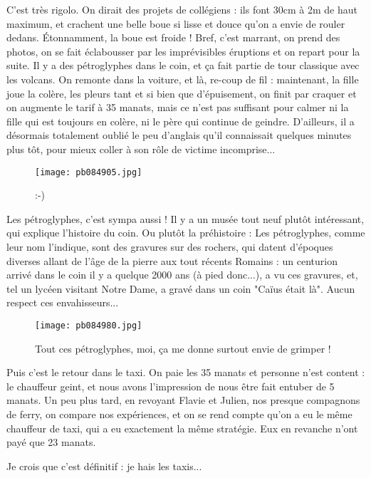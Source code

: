 \documentclass{book}
\begin{document}
C'est très rigolo. On dirait des projets de collégiens : ils font 30cm à 2m de haut maximum, et crachent une belle boue si lisse et douce qu'on a envie de rouler dedans. Étonnamment, la boue est froide ! Bref, c'est marrant, on prend des photos, on se fait éclabousser par les imprévisibles éruptions et on repart pour la suite. Il y a des pétroglyphes dans le coin, et ça fait partie de tour classique avec les volcans. On remonte dans la voiture, et là, re-coup de fil : maintenant, la fille joue la colère, les pleurs tant et si bien que d'épuisement, on finit par craquer et on augmente le tarif à 35 manats, mais ce n'est pas suffisant pour calmer ni la fille qui est toujours en colère, ni le père qui continue de geindre. D'ailleurs, il a désormais totalement oublié le peu d'anglais qu'il connaissait quelques minutes plus tôt, pour mieux coller à son rôle de victime incomprise...


\begin{figure}[h]
\centering
\texttt{[image: pb084905.jpg]}
\caption*{:-)}
\end{figure}

Les pétroglyphes, c'est sympa aussi ! Il y a un musée tout neuf plutôt intéressant, qui explique l'histoire du coin. Ou plutôt la préhistoire : Les pétroglyphes, comme leur nom l'indique, sont des gravures sur des rochers, qui datent d'époques diverses allant de l'âge de la pierre aux tout récents Romains : un centurion arrivé dans le coin il y a quelque 2000 ans (à pied donc...), a vu ces gravures, et, tel un lycéen visitant Notre Dame, a gravé dans un coin "Caïus était là". Aucun respect ces envahisseurs...


\begin{figure}[h]
\centering
\texttt{[image: pb084980.jpg]}
\caption*{Tout ces pétroglyphes, moi, ça me donne surtout envie de grimper !}
\end{figure}

Puis c'est le retour dans le taxi. On paie les 35 manats et personne n'est content : le chauffeur geint, et nous avons l'impression de nous être fait entuber de 5 manats. Un peu plus tard, en revoyant Flavie et Julien, nos presque compagnons de ferry, on compare nos expériences, et on se rend compte qu'on a eu le même chauffeur de taxi, qui a eu exactement la même stratégie. Eux en revanche n'ont payé que 23 manats.

Je crois que c'est définitif : je hais les taxis...
\end{document}
